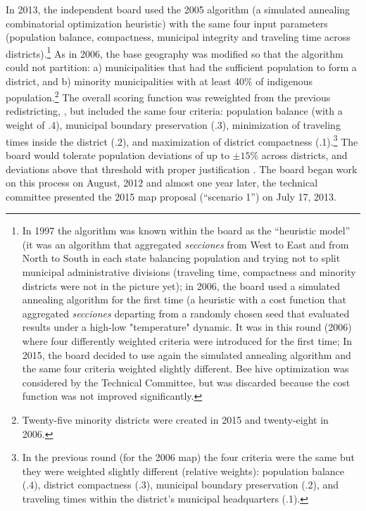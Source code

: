 \documentclass[letter,12pt]{article}
\begin{document}
In 2013, the independent board used the 2005 algorithm (a simulated annealing combinatorial optimization heuristic) with the same four input parameters (population balance, compactness, municipal integrity and traveling time across districts).\footnote{In 1997 the algorithm was known within the board as the ``heuristic model'' (it was an algorithm that aggregated \emph{secciones} from West to East and from North to South in each state balancing population and trying not to split municipal administrative divisions (traveling time, compactness and minority districts were not in the picture yet); in 2006, the board used a simulated annealing algorithm for the first time (a heuristic with a cost function that aggregated \emph{secciones} departing from a randomly chosen seed that evaluated results under a high-low "temperature" dynamic. It was in this round (2006) where four differently weighted criteria  were introduced for the first time; In 2015, the board decided to use again the simulated annealing algorithm and the same four criteria weighted slightly different. Bee hive optimization was considered by the Technical Committee, but was discarded because the cost function was not improved significantly.} As in 2006, the base geography was modified so that the algorithm could not partition: a) municipalities that had the sufficient population to form a district, and b) minority municipalities with at least 40\% of indigenous population.\footnote{Twenty-five minority districts were created in 2015 and twenty-eight in 2006.} The overall scoring function was reweighted from the previous redistricting, \citep{trelles.mtz.tesisItam.2007,acuerdoife2013}, but included the same four criteria: population balance (with a weight of .4), municipal boundary preservation (.3), minimization of traveling times inside the district (.2), and maximization of district compactness (.1).\footnote{In the previous round (for the 2006 map) the four criteria were the same but they were weighted slightly different (relative weights): population balance (.4), district compactness (.3), municipal boundary preservation (.2), and traveling times within the district's municipal headquarters (.1).} The board would tolerate population deviations of up to $\pm 15\%$ across districts, and deviations above that threshold with proper justification \citep{acuerdo.ife.2013}. The board began work on this process on August, 2012 and almost one year later, the technical committee presented the 2015 map proposal (``scenario 1'') on July 17, 2013. 
\end{document}
